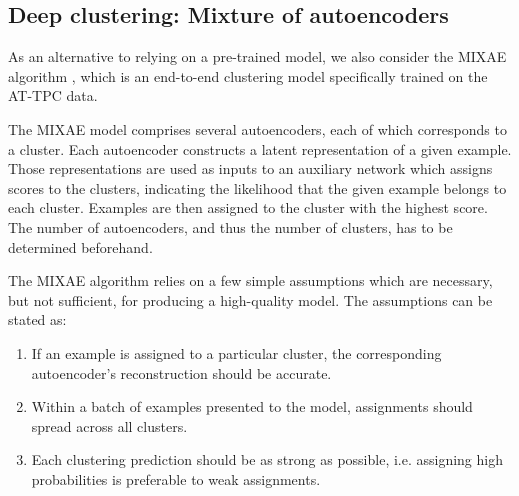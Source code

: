 \documentclass[review,sort&compress]{elsarticle}
\newcommand{\R}{\mathbb{R}}
\begin{document}


\subsection{Deep clustering: Mixture of autoencoders}\label{sec:mixae}

As an alternative to relying on a pre-trained model, we also consider the MIXAE algorithm \cite{Zhang}, which is an end-to-end clustering model specifically trained on the AT-TPC data.

The MIXAE model comprises several autoencoders, each of which corresponds to a cluster.  Each autoencoder constructs a latent representation of a given example. Those representations are used as inputs to an auxiliary network which assigns scores to the clusters, indicating the likelihood that the given example belongs to each cluster. Examples are then assigned to the cluster with the highest score.  
The number of autoencoders, and thus the number of clusters, has to be determined beforehand.

The MIXAE algorithm relies on a few simple assumptions which are necessary, but not sufficient, for producing a high-quality model. The assumptions can be stated as: 
\begin{enumerate}
	\item  If an example is assigned to a particular cluster, the corresponding autoencoder's reconstruction should be accurate. 
	\item Within a batch of examples presented to the model, assignments should spread across all clusters. 
	\item Each clustering prediction should be as strong as possible, i.e. assigning high probabilities is preferable to weak assignments.
\end{enumerate}
\end{document}
